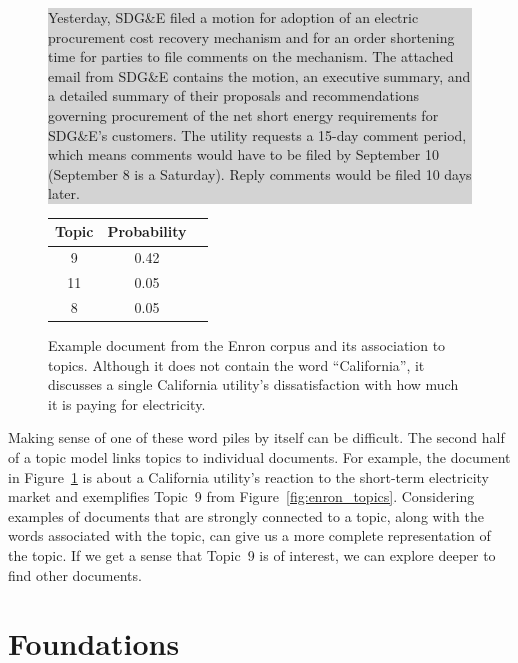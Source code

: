 \begin{figure}

\begin{center}
\colorbox{lightgray}{ \parbox{.9\linewidth}{
Yesterday, SDG\&E filed a motion for adoption of an
electric procurement cost recovery mechanism and for an order
shortening time for parties to file comments on the mechanism. The
attached email from SDG\&E contains the motion, an executive summary,
and a detailed summary of their proposals and recommendations
governing procurement of the net short energy requirements for
SDG\&E's customers. The utility requests a 15-day comment period, which
means comments would have to be filed by September 10 (September 8
is a Saturday). Reply comments would be filed 10 days later.}}

\begin{tabular}{ccl}
  Topic & Probability \\
  \hline
  9 & 0.42  \\
  11 & 0.05 \\
  8 & 0.05 \\
  \hline
\end{tabular}
\end{center}
  \caption{Example document from the Enron corpus and its association
    to topics.  Although it does not contain the word ``California'',
    it discusses a single California utility's dissatisfaction with how
    much it is paying for electricity.}
  \label{fig:enron_doc}
\end{figure}

Making sense of one of these word piles by itself can be difficult.
The second half of a topic model links topics to individual documents.
For example, the document in
Figure~\ref{fig:enron_doc} is about a California utility's reaction to
the short-term electricity market and exemplifies Topic~9 from
Figure~\ref{fig:enron_topics}.
Considering examples of documents that are strongly connected to a topic, along with the words associated with the topic, can give us a more complete representation of the topic.
If we get a sense that Topic~9 is of
interest, we can explore deeper to find other documents.

\section{Foundations}

